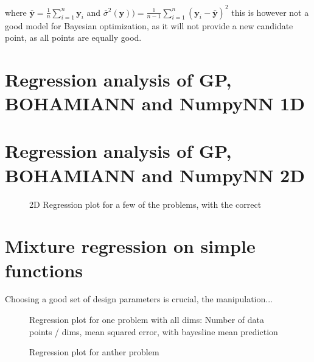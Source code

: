 where $\bar{\textbf{y}} = \frac{1}{n}\sum_{i=1}^n \textbf{y}_i $ and 
$\bar{\sigma}^2 (\textbf{y})) = \frac{1}{n-1}\sum_{i=1}^n (\textbf{y}_i-\bar{\textbf{y}})^2 $
this is however not a good model for Bayesian optimization, as it will not provide a
new candidate point, as all points are equally good. 

\section{Regression analysis of GP, BOHAMIANN and NumpyNN 1D}

\section{Regression analysis of GP, BOHAMIANN and NumpyNN 2D}
\begin{figure}[h]
  \caption{2D Regression plot for a few of the problems, with the correct }
\end{figure}

\section{Mixture regression on simple functions}
Choosing a good set of design parameters is crucial, 
the manipulation... 

\begin{figure}[h]
    \caption{Regression plot for one problem with all dims: Number of data points / dims, mean squared error, with bayesline mean prediction}
\end{figure}

\begin{figure}[h]
    \caption{Regression plot for anther problem}
\end{figure}

